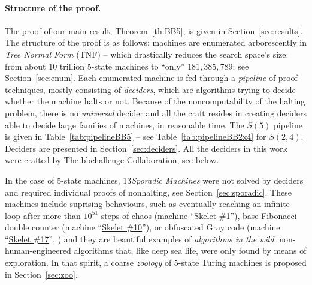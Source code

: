 \documentclass[a4paper,british]{article}
\theoremstyle{definition} %
\numberwithin{equation}{section}
\theoremstyle{definition} %
\newcommand{\BBtheFifthTNF}{181{,}385{,}789}
\newcommand{\numSporadic}{13\xspace}
\begin{document}
\paragraph{Structure of the proof.} The proof of our main result, Theorem~\ref{th:BB5}, is given in Section~\ref{sec:results}. The structure of the proof is as follows: machines are enumerated arborescently in \textit{Tree Normal Form} (TNF) \cite{Brady64} -- which drastically reduces the search space's size: from about 10 trillion 5-state machines to ``only'' $\BBtheFifthTNF$; see Section~\ref{sec:enum}. Each enumerated machine is fed through a \textit{pipeline} of proof techniques, mostly consisting of \textit{deciders}, which are algorithms trying to decide whether the machine halts or not. Because of the noncomputability of the halting problem, there is no \textit{universal} decider and all the craft resides in creating deciders able to decide large families of machines, in reasonable time. The $S(5)$ pipeline is given in Table~\ref{tab:pipelineBB5} -- see Table~\ref{tab:pipelineBB2x4} for $S(2,4)$. Deciders are presented in Section~\ref{sec:deciders}. All the deciders in this work were crafted by The bbchallenge Collaboration, see below.

In the case of 5-state machines, \numSporadic \textit{Sporadic Machines} were not solved by deciders and required individual proofs of nonhalting, see Section~\ref{sec:sporadic}. These machines include suprising behaviours, such as eventually reaching an infinite loop after more than $10^{51}$ steps of chaos (machine ``\href{https://bbchallenge.org/1RB1RD_1LC0RC_1RA1LD_0RE0LB_---1RC}{Skelet \#1}''), base-Fibonacci double counter (machine ``\href{https://bbchallenge.org/1RB0RA_0LC1RA_1RE1LD_1LC0LD_---0RB}{Skelet \#10}''), or obfuscated Gray code (machine ``\href{https://bbchallenge.org/1RB---_0LC1RE_0LD1LC_1RA1LB_0RB0RA}{Skelet \#17}'', \cite{xu2024skelet17fifthbusy}) and they are beautiful examples of \textit{algorithms in the wild}: non-human-engineered algorithms that, like deep sea life, were only found by means of exploration. In that spirit, a coarse \textit{zoology} of 5-state Turing machines is proposed in Section~\ref{sec:zoo}.
\end{document}
